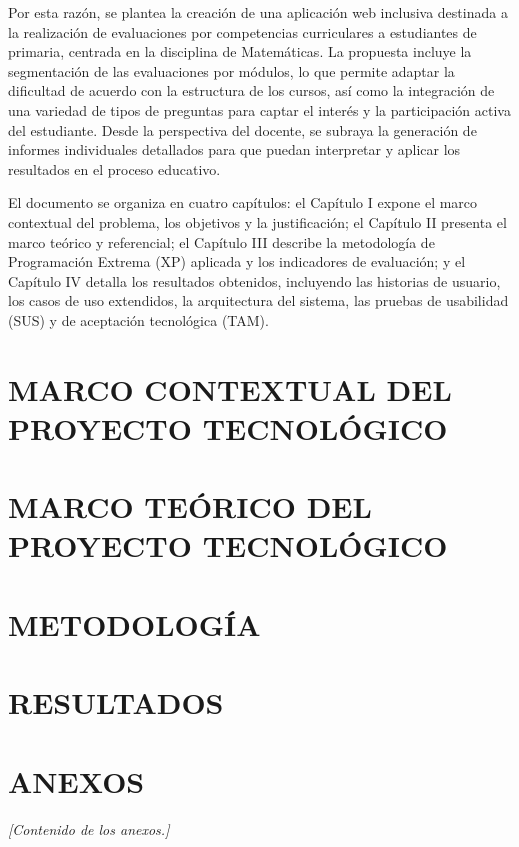 \documentclass[12pt,a4paper]{report}
\begin{document}
Por esta razón, se plantea la creación de una aplicación web inclusiva destinada a la realización de evaluaciones por competencias curriculares a estudiantes de primaria, centrada en la disciplina de Matemáticas. La propuesta incluye la segmentación de las evaluaciones por módulos, lo que permite adaptar la dificultad de acuerdo con la estructura de los cursos, así como la integración de una variedad de tipos de preguntas para captar el interés y la participación activa del estudiante. Desde la perspectiva del docente, se subraya la generación de informes individuales detallados para que puedan interpretar y aplicar los resultados en el proceso educativo.

El documento se organiza en cuatro capítulos: el Capítulo I expone el marco contextual del problema, los objetivos y la justificación; el Capítulo II presenta el marco teórico y referencial; el Capítulo III describe la metodología de Programación Extrema (XP) aplicada y los indicadores de evaluación; y el Capítulo IV detalla los resultados obtenidos, incluyendo las historias de usuario, los casos de uso extendidos, la arquitectura del sistema, las pruebas de usabilidad (SUS) y de aceptación tecnológica (TAM).

\chapter{MARCO CONTEXTUAL DEL PROYECTO TECNOLÓGICO}


\chapter{MARCO TEÓRICO DEL PROYECTO TECNOLÓGICO}


\chapter{METODOLOGÍA}


\chapter{RESULTADOS}


\appendix
\chapter*{ANEXOS}
\textit{[Contenido de los anexos.]}
\end{document}
